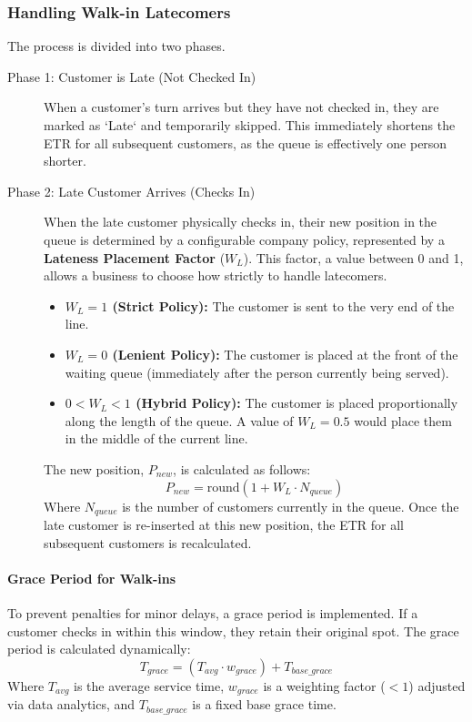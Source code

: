 \documentclass{article}
\begin{document}
\subsubsection{Handling Walk-in Latecomers}
The process is divided into two phases.
\begin{description}
    \item[Phase 1: Customer is Late (Not Checked In)] When a customer's turn arrives but they have not checked in, they are marked as `Late` and temporarily skipped. This immediately shortens the ETR for all subsequent customers, as the queue is effectively one person shorter.
    \item[Phase 2: Late Customer Arrives (Checks In)] When the late customer physically checks in, their new position in the queue is determined by a configurable company policy, represented by a \textbf{Lateness Placement Factor} ($W_L$). This factor, a value between 0 and 1, allows a business to choose how strictly to handle latecomers.
    \begin{itemize}
        \item \textbf{$W_L = 1$ (Strict Policy):} The customer is sent to the very end of the line.
        \item \textbf{$W_L = 0$ (Lenient Policy):} The customer is placed at the front of the waiting queue (immediately after the person currently being served).
        \item \textbf{$0 < W_L < 1$ (Hybrid Policy):} The customer is placed proportionally along the length of the queue. A value of $W_L=0.5$ would place them in the middle of the current line.
    \end{itemize}
    The new position, $P_{new}$, is calculated as follows:
    \begin{equation}
        P_{new} = \text{round}(1 + W_L \cdot N_{queue})
    \end{equation}
    Where $N_{queue}$ is the number of customers currently in the queue. Once the late customer is re-inserted at this new position, the ETR for all subsequent customers is recalculated.
\end{description}

\paragraph{Grace Period for Walk-ins} To prevent penalties for minor delays, a grace period is implemented. If a customer checks in within this window, they retain their original spot. The grace period is calculated dynamically:
\begin{equation}
    T_{grace} = (T_{avg} \cdot w_{grace}) + T_{base\_grace}
\end{equation}
Where $T_{avg}$ is the average service time, $w_{grace}$ is a weighting factor ($< 1$) adjusted via data analytics, and $T_{base\_grace}$ is a fixed base grace time.
\end{document}
